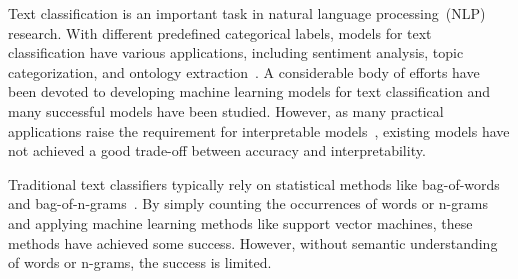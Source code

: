 \documentclass[10pt,journal,compsoc]{IEEEtran}
\begin{document}
%
\IEEEpeerreviewmaketitle




Text classification is an important task in natural language
processing~(NLP) research. With different predefined categorical
labels, models for text classification have various applications,
including sentiment analysis, topic categorization, and ontology
extraction~\cite{zhang2015character}.
A considerable body of efforts have been devoted to
developing machine learning models for text classification and many
successful models have been studied. However, as many practical
applications raise the requirement for interpretable models~\cite{du2018techniques,du2019learning,du2018towards,yang2019xfake,shu2019defend}, existing models
have not achieved a good trade-off between accuracy and interpretability.


Traditional text classifiers typically rely on statistical methods
like bag-of-words and bag-of-n-grams~\cite{joachims1998text}. By
simply counting the occurrences of words or n-grams and applying
machine learning methods like support vector machines, these methods
have achieved some success. However, without semantic understanding
of words or n-grams, the success is limited.
\end{document}

